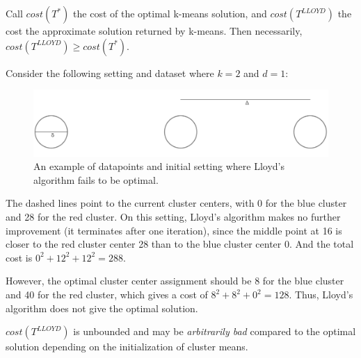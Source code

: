 \begin{remark}
Call $cost(T^*)$ the cost of the optimal k-means solution, and $cost(T^{LLOYD})$ the cost the approximate solution returned by k-means. Then necessarily, $cost(T^{LLOYD}) \geq cost(T^*)$.
\end{remark}

\begin{example} Consider the following setting and dataset
where $k=2$ and $d=1$:
\begin{figure}
    \centering
    \captionsetup{width=0.8\textwidth}
    \includegraphics[scale=0.4]{chapter_1/files/kmeans.png}
    \caption{An example of datapoints and initial setting where
    Lloyd's algorithm fails to be optimal.}
    \label{fig:kmeans}
\end{figure}

The dashed lines point to the current cluster centers, with 0
for the blue cluster and 28 for the red cluster. On this
setting, Lloyd's algorithm makes no further improvement (it
terminates after one iteration), since the middle point at 16
is closer to the red cluster center 28 than to the blue cluster
center 0. And the total cost is $0^2+12^2+12^2=288$.

However, the optimal cluster center assignment should be 8 for
the blue cluster and 40 for the red cluster, which gives a cost
of $8^2+8^2+0^2=128$. Thus, Lloyd's algorithm does not give the
optimal solution.
\end{example}

\begin{remark}
$cost(T^{LLOYD})$ is unbounded and may be \emph{arbitrarily bad} compared to the optimal solution depending on the initialization of cluster means.
\end{remark}

